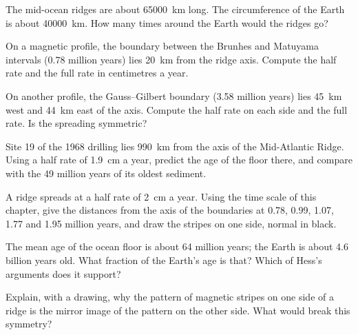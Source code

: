 \begin{exercise}[$\star$]\label{exo:g11:drift-to-spreading:5}
The mid-ocean ridges are about \qty{65000}{km} long. The circumference of the
Earth is about \qty{40000}{km}. How many times around the Earth would the
ridges go?
\end{exercise}

\begin{exercise}[$\star\star$]\label{exo:g11:drift-to-spreading:6}
On a magnetic profile, the boundary between the Brunhes and Matuyama intervals
(\num{0.78} million years) lies \qty{20}{km} from the ridge axis. Compute the
half rate and the full rate in centimetres a year.
\end{exercise}

\begin{exercise}[$\star\star$]\label{exo:g11:drift-to-spreading:7}
On another profile, the Gauss--Gilbert boundary (\num{3.58} million years) lies
\qty{45}{km} west and \qty{44}{km} east of the axis. Compute the half rate on
each side and the full rate. Is the spreading symmetric?
\end{exercise}

\begin{exercise}[$\star\star$]\label{exo:g11:drift-to-spreading:8}
Site 19 of the 1968 drilling lies \qty{990}{km} from the axis of the
Mid-Atlantic Ridge. Using a half rate of \qty{1.9}{cm} a year, predict the
age of the floor there, and compare with the \num{49} million years of its
oldest sediment.
\end{exercise}

\begin{exercise}[$\star\star$]\label{exo:g11:drift-to-spreading:9}
A ridge spreads at a half rate of \qty{2}{cm} a year. Using the time scale of
this chapter, give the distances from the axis of the boundaries at 0.78,
0.99, 1.07, 1.77 and 1.95 million years, and draw the stripes on one side,
normal in black.
\end{exercise}

\begin{exercise}[$\star\star$]\label{exo:g11:drift-to-spreading:10}
The mean age of the ocean floor is about \num{64} million years; the Earth is
about \num{4.6} billion years old. What fraction of the Earth's age is that?
Which of Hess's arguments does it support?
\end{exercise}

\begin{exercise}[$\star\star$]\label{exo:g11:drift-to-spreading:11}
Explain, with a drawing, why the pattern of magnetic stripes on one side of a
ridge is the mirror image of the pattern on the other side. What would break
this symmetry?
\end{exercise}

